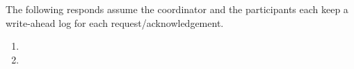 The following responds assume the coordinator and the participants each keep a write-ahead log for each request/acknowledgement.
\begin{enumerate}[1]
\item
\item
\end{enumerate}
